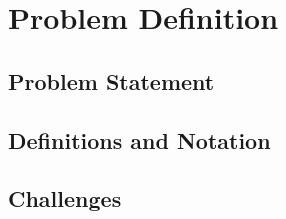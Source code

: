 %
%

\section{Problem Definition}
\label{sec:problem-definition}


\subsection{Problem Statement}
\label{sec:problem-statement}

\subsection{Definitions and Notation}
\label{sec:notation}

\subsection{Challenges}
\label{sec:challenges}

